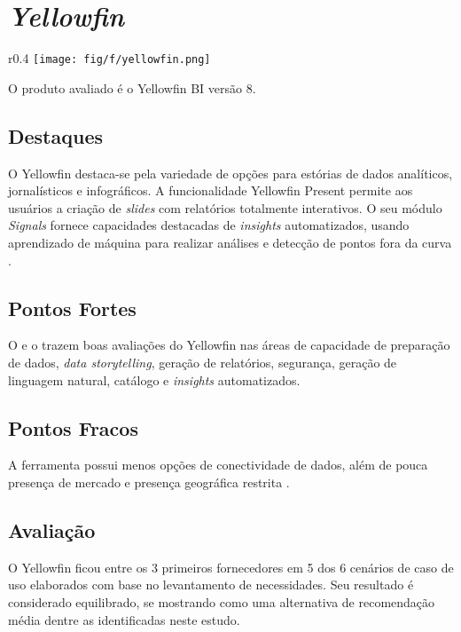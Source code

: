 \section{\emph{Yellowfin}}
\label{sub-yellowfin}

\begin{wrapfigure}[3]{r}{0.4\textwidth}     
    \centering
    \texttt{[image: fig/f/yellowfin.png]}
\end{wrapfigure}

O produto avaliado é o Yellowfin BI versão 8.

\subsection*{Destaques}

O Yellowfin destaca-se pela variedade de opções para estórias de dados analíticos, jornalísticos e infográficos. A funcionalidade Yellowfin Present permite aos usuários a criação de \emph{slides} com relatórios totalmente interativos. O seu módulo \emph{Signals} fornece capacidades destacadas de \emph{insights} automatizados, usando aprendizado de máquina para realizar análises e detecção de pontos fora da curva \cite{gartner:criticalcapabilities}.

\subsection*{Pontos Fortes}

O \relGMQ \xspace e o \relGCC \xspace trazem boas avaliações do Yellowfin nas áreas de capacidade de preparação de dados, \emph{data storytelling}, geração de relatórios, segurança, geração de linguagem natural, catálogo e \emph{insights} automatizados.

\subsection*{Pontos Fracos}

A ferramenta possui menos opções de conectividade de dados, além de pouca presença de mercado e presença geográfica restrita \cite{gartner:magicquadrant}.

\subsection*{Avaliação}

O Yellowfin ficou entre os 3 primeiros fornecedores em 5 dos 6 cenários de caso de uso elaborados com base no levantamento de necessidades. Seu resultado é considerado equilibrado, se mostrando como uma alternativa de recomendação média dentre as identificadas neste estudo.


